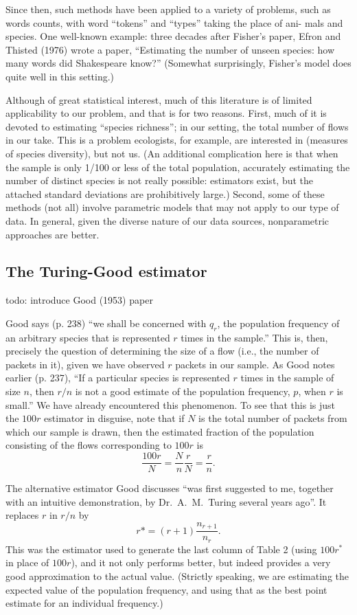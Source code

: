 \documentclass{paper}
\begin{document}
Since then, such methods have been applied to a variety of problems, such as
words counts, with word ``tokens'' and ``types'' taking the place of ani- mals
and species. One well-known example: three decades after Fisher's paper, Efron
and Thisted (1976) wrote a paper, ``Estimating the number of unseen species:
how many words did Shakespeare know?'' (Somewhat surprisingly, Fisher's model
does quite well in this setting.)

Although of great statistical interest, much of this literature is of limited
applicability to our problem, and that is for two reasons. First, much of it is
devoted to estimating ``species richness''; in our setting, the total number of
flows in our take. This is a problem ecologists, for example, are interested in
(measures of species diversity), but not us. (An additional complication here
is that when the sample is only 1/100 or less of the total population,
accurately estimating the number of distinct species is not really possible:
estimators exist, but the attached standard deviations are prohibitively
large.) Second, some of these methods (not all) involve parametric models that
may not apply to our type of data. In general, given the diverse nature of our
data sources, nonparametric approaches are better.

\subsection{The Turing-Good estimator}

todo: introduce Good (1953) paper

Good says (p. 238) ``we shall be concerned with $q_r$, the population frequency
of an arbitrary species that is represented $r$ times in the sample.'' This is,
then, precisely the question of determining the size of a flow (i.e., the
number of packets in it), given we have observed $r$ packets in our sample. As
Good notes earlier (p. 237), ``If a particular species is represented $r$ times
in the sample of size $n$, then $r/n$ is not a good estimate of the population
frequency, $p$, when $r$ is small.'' We have already encountered this
phenomenon. To see that this is just the $100r$ estimator in disguise, note that
if $N$ is the total number of packets from which our sample is drawn, then the
estimated fraction of the population consisting of the flows corresponding to
$100r$ is
$$ \frac{100r}{N} = \frac{N}{n}\frac{r}{N} = \frac{r}{n}. $$

The alternative estimator Good discusses ``was first suggested to me, together
with an intuitive demonstration, by Dr.\ A.\ M.\ Turing several years ago''. It
replaces $r$ in $r/n$ by
$$ r* = (r + 1) \frac{n_{r+1}}{n_r}. $$
This was the estimator used to generate the last column of Table 2 (using
$100r^*$ in place of $100r$), and it not only performs better, but indeed
provides a very good approximation to the actual value. (Strictly speaking, we
are estimating the expected value of the population frequency, and using that
as the best point estimate for an individual frequency.)
\end{document}
